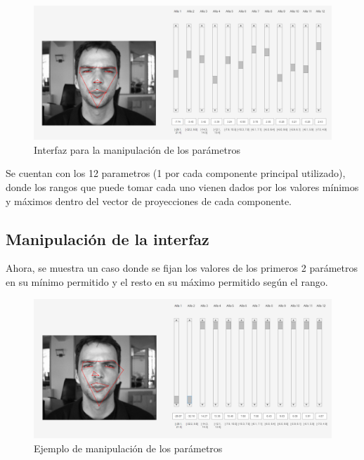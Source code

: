 \documentclass[11pt, letterpaper]{article}
\begin{document}
\begin{figure}[h!]
	\centering %
	\includegraphics[width=1\textwidth]{IMG/G4.png} %
	\caption{Interfaz para la manipulación de los parámetros}
	\label{fig:f5}
\end{figure}

Se cuentan con los 12 parametros (1 por cada componente principal utilizado), donde los rangos que puede tomar cada uno vienen dados por los valores mínimos y máximos dentro del vector de proyecciones de cada componente.

\newpage

\subsection{Manipulación de la interfaz}

Ahora, se muestra un caso donde se fijan los valores de los primeros 2 parámetros en su mínimo permitido y el resto en su máximo permitido según el rango.

\begin{figure}[h!]
	\centering %
	\includegraphics[width=1\textwidth]{IMG/G5.png} %
	\caption{Ejemplo de manipulación de los parámetros}
	\label{fig:f6}
\end{figure}
\end{document}
